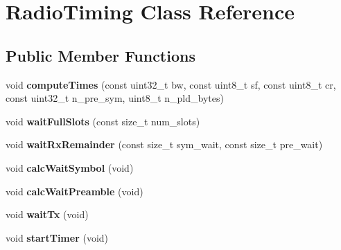 \hypertarget{classRadioTiming}{}\section{Radio\+Timing Class Reference}
\label{classRadioTiming}
\subsection*{Public Member Functions}
\begin{DoxyCompactItemize}
\item 
\mbox{\label{classRadioTiming_a8889214bcfb05975e8ed121a59ffb06c}} 
void {\bfseries compute\+Times} (const uint32\+\_\+t bw, const uint8\+\_\+t sf, const uint8\+\_\+t cr, const uint32\+\_\+t n\+\_\+pre\+\_\+sym, uint8\+\_\+t n\+\_\+pld\+\_\+bytes)
\item 
\mbox{\label{classRadioTiming_a5968dcc1c5dc7aa644e4fd4b3c44f373}} 
void {\bfseries wait\+Full\+Slots} (const size\+\_\+t num\+\_\+slots)
\item 
\mbox{\label{classRadioTiming_ab794bed8927778ed17a9cbbfe1cf4a5f}} 
void {\bfseries wait\+Rx\+Remainder} (const size\+\_\+t sym\+\_\+wait, const size\+\_\+t pre\+\_\+wait)
\item 
\mbox{\label{classRadioTiming_a763af2aa098f7b311c149dbf062d40a2}} 
void {\bfseries calc\+Wait\+Symbol} (void)
\item 
\mbox{\label{classRadioTiming_ab88cd62548731862e0a24c986bf095bf}} 
void {\bfseries calc\+Wait\+Preamble} (void)
\item 
\mbox{\label{classRadioTiming_a8451969371826cd733288652f5323053}} 
void {\bfseries wait\+Tx} (void)
\item 
\mbox{\label{classRadioTiming_a20de4c0e271dcab020ab6fa999570855}} 
void {\bfseries start\+Timer} (void)
\end{DoxyCompactItemize}

